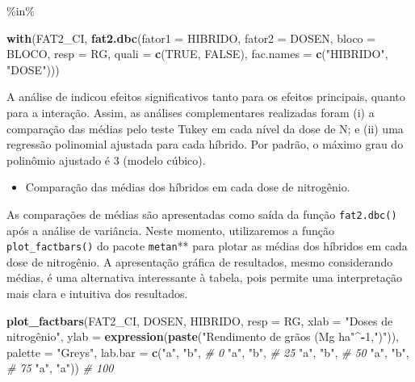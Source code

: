 \documentclass[
]{book}
\makeatletter
\newenvironment{Shaded}{\begin{snugshade}}{\end{snugshade}}
\newcommand{\CommentTok}[1]{\textcolor[rgb]{0.56,0.35,0.01}{\textit{#1}}}
\newcommand{\DataTypeTok}[1]{\textcolor[rgb]{0.13,0.29,0.53}{#1}}
\newcommand{\DecValTok}[1]{\textcolor[rgb]{0.00,0.00,0.81}{#1}}
\newcommand{\KeywordTok}[1]{\textcolor[rgb]{0.13,0.29,0.53}{\textbf{#1}}}
\newcommand{\NormalTok}[1]{#1}
\newcommand{\OperatorTok}[1]{\textcolor[rgb]{0.81,0.36,0.00}{\textbf{#1}}}
\newcommand{\OtherTok}[1]{\textcolor[rgb]{0.56,0.35,0.01}{#1}}
\newcommand{\StringTok}[1]{\textcolor[rgb]{0.31,0.60,0.02}{#1}}
\providecommand{\tightlist}{%
  \setlength{\itemsep}{0pt}\setlength{\parskip}{0pt}}
\numberwithin{equation}{section}
\newcommand{\indf}[1]{\index[function]{#1@\texttt{#1()}|ST}}
\makeatother
\begin{document}
\%in\%

\begin{Shaded}
\begin{Highlighting}[]
\KeywordTok{with}\NormalTok{(FAT2\_CI, }
     \KeywordTok{fat2.dbc}\NormalTok{(}\DataTypeTok{fator1 =}\NormalTok{  HIBRIDO,}
     \DataTypeTok{fator2 =}\NormalTok{  DOSEN,}
     \DataTypeTok{bloco =}\NormalTok{ BLOCO,}
     \DataTypeTok{resp =}\NormalTok{  RG,}
     \DataTypeTok{quali =} \KeywordTok{c}\NormalTok{(}\OtherTok{TRUE}\NormalTok{, }\OtherTok{FALSE}\NormalTok{),}
     \DataTypeTok{fac.names =} \KeywordTok{c}\NormalTok{(}\StringTok{"HIBRIDO"}\NormalTok{, }\StringTok{"DOSE"}\NormalTok{)))}
\end{Highlighting}
\end{Shaded}

A análise de indicou efeitos significativos tanto para os efeitos principais, quanto para a interação. Assim, as análises complementares realizadas foram (i) a comparação das médias pelo teste Tukey em cada nível da dose de N; e (ii) uma regressão polinomial ajustada para cada híbrido. Por padrão, o máximo grau do polinômio ajustado é 3 (modelo cúbico).

\begin{itemize}
\tightlist
\item
  Comparação das médias dos híbridos em cada dose de nitrogênio.
\end{itemize}

As comparações de médias são apresentadas como saída da função \texttt{fat2.dbc()} após a análise de variância. Neste momento, utilizaremos a função \texttt{plot\_factbars()} \indf{plot\_factbars} do pacote \texttt{metan}** para plotar as médias dos híbridos em cada dose de nitrogênio. A apresentação gráfica de resultados, mesmo considerando médias, é uma alternativa interessante à tabela, pois permite uma interpretação mais clara e intuitiva dos resultados.

\begin{Shaded}
\begin{Highlighting}[]
\KeywordTok{plot\_factbars}\NormalTok{(FAT2\_CI, DOSEN, HIBRIDO,}
              \DataTypeTok{resp =}\NormalTok{ RG,}
              \DataTypeTok{xlab =} \StringTok{"Doses de nitrogênio"}\NormalTok{,}
              \DataTypeTok{ylab =} \KeywordTok{expression}\NormalTok{(}\KeywordTok{paste}\NormalTok{(}\StringTok{"Rendimento de grãos (Mg ha"}\OperatorTok{\^{}{-}}\DecValTok{1}\NormalTok{,}\StringTok{")"}\NormalTok{)),}
              \DataTypeTok{palette =} \StringTok{"Greys"}\NormalTok{,}
              \DataTypeTok{lab.bar =} \KeywordTok{c}\NormalTok{(}\StringTok{"a"}\NormalTok{, }\StringTok{"b"}\NormalTok{, }\CommentTok{\# 0}
                          \StringTok{"a"}\NormalTok{, }\StringTok{"b"}\NormalTok{, }\CommentTok{\# 25}
                          \StringTok{"a"}\NormalTok{, }\StringTok{"b"}\NormalTok{, }\CommentTok{\# 50}
                          \StringTok{"a"}\NormalTok{, }\StringTok{"b"}\NormalTok{, }\CommentTok{\# 75}
                          \StringTok{"a"}\NormalTok{, }\StringTok{"a"}\NormalTok{)) }\CommentTok{\# 100}
\end{Highlighting}
\end{Shaded}
\end{document}

